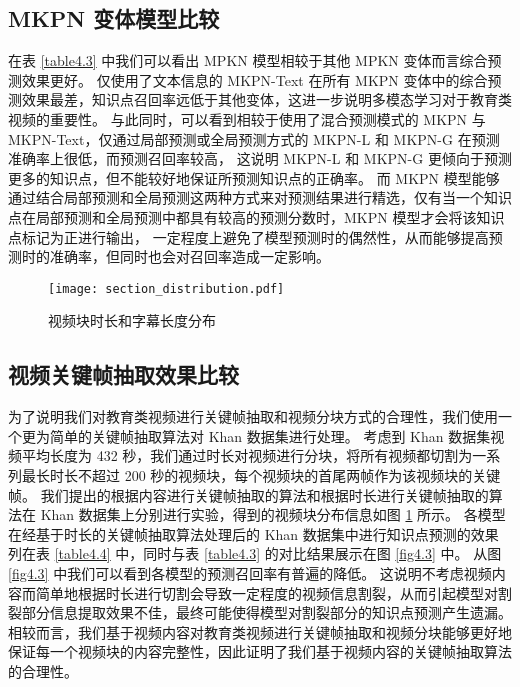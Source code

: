     \subsection{MKPN 变体模型比较}
    在表 \ref{table4.3} 中我们可以看出 MPKN 模型相较于其他 MPKN 变体而言综合预测效果更好。
    仅使用了文本信息的 MKPN-Text 在所有 MKPN 变体中的综合预测效果最差，知识点召回率远低于其他变体，这进一步说明多模态学习对于教育类视频的重要性。
    与此同时，可以看到相较于使用了混合预测模式的 MKPN 与 MKPN-Text，仅通过局部预测或全局预测方式的 MKPN-L 和 MKPN-G 在预测准确率上很低，而预测召回率较高，
    这说明 MKPN-L 和 MKPN-G 更倾向于预测更多的知识点，但不能较好地保证所预测知识点的正确率。
    而 MKPN 模型能够通过结合局部预测和全局预测这两种方式来对预测结果进行精选，仅有当一个知识点在局部预测和全局预测中都具有较高的预测分数时，MKPN 模型才会将该知识点标记为正进行输出，
    一定程度上避免了模型预测时的偶然性，从而能够提高预测时的准确率，但同时也会对召回率造成一定影响。

    \begin{figure}[htb]
        \centering
        \texttt{[image: section\_distribution.pdf]}
        \caption{视频块时长和字幕长度分布}
        \label{fig4.2}
    \end{figure}

    \subsection{视频关键帧抽取效果比较}
    为了说明我们对教育类视频进行关键帧抽取和视频分块方式的合理性，我们使用一个更为简单的关键帧抽取算法对 Khan 数据集进行处理。
    考虑到 Khan 数据集视频平均长度为 432 秒，我们通过时长对视频进行分块，将所有视频都切割为一系列最长时长不超过 200 秒的视频块，每个视频块的首尾两帧作为该视频块的关键帧。
    我们提出的根据内容进行关键帧抽取的算法和根据时长进行关键帧抽取的算法在 Khan 数据集上分别进行实验，得到的视频块分布信息如图 \ref{fig4.2} 所示。
    各模型在经基于时长的关键帧抽取算法处理后的 Khan 数据集中进行知识点预测的效果列在表 \ref{table4.4} 中，同时与表 \ref{table4.3} 的对比结果展示在图 \ref{fig4.3} 中。
    从图 \ref{fig4.3} 中我们可以看到各模型的预测召回率有普遍的降低。
    这说明不考虑视频内容而简单地根据时长进行切割会导致一定程度的视频信息割裂，从而引起模型对割裂部分信息提取效果不佳，最终可能使得模型对割裂部分的知识点预测产生遗漏。
    相较而言，我们基于视频内容对教育类视频进行关键帧抽取和视频分块能够更好地保证每一个视频块的内容完整性，因此证明了我们基于视频内容的关键帧抽取算法的合理性。

